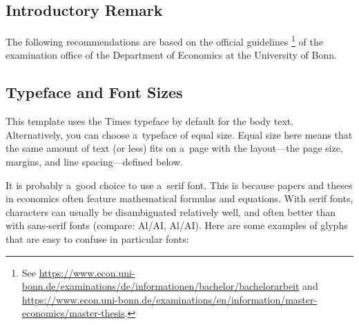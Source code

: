 \documentclass[11pt, a4paper, oneside]{article}
\newlength{\baselinedist}
\newlength{\smalllinespacing}
\newlength{\fsnormal}
\theoremstyle{Plain}
\theoremstyle{Definition}
\theoremstyle{Remark}
\begin{document}
\begingroup

\let \longtblrOrig \longtblr
\renewcommand{\longtblr}{%
	\fontsize{\fsnormal}{\smalllinespacing}\selectfont%
	\longtblrOrig%
}

\subsection{Introductory Remark}
The following recommendations are based on the official guidelines%
\footnote{See \url{https://www.econ.uni-bonn.de/examinations/de/informationen/bachelor/bachelorarbeit} and \url{https://www.econ.uni-bonn.de/examinations/en/information/master-economics/master-thesis}.}
of the examination office of the Department of Economics at the University of Bonn.

\subsection{Typeface and Font Sizes}
This template uses the Times typeface by default for the body text. Alternatively, you can choose a~typeface of equal size. Equal size here means that the same amount of text (or less) fits on a~page with the layout---the page size, margins, and line spacing---defined below.

It is probably a~good choice to use a~serif font. This is because papers and theses in economics often feature mathematical formulas and equations. With serif fonts, characters can usually be disambiguated relatively well, and often better than with sans-serif fonts (compare: Al/AI, {\selectfont Al/AI}). Here are some examples of glyphs that are easy to confuse in particular fonts:
\end{document}
